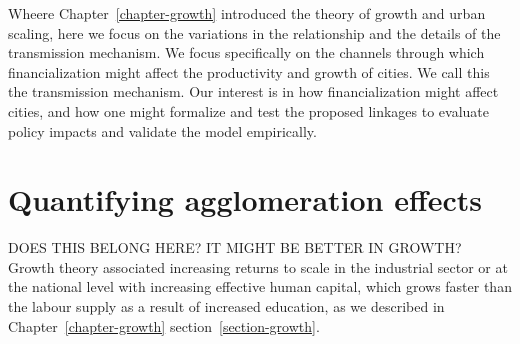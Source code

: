 Wheere Chapter~\ref{chapter-growth} introduced the theory of growth and urban scaling, here we focus on the variations in the relationship and the details of the transmission mechanism. We focus specifically on the channels through which financialization might affect the productivity and growth of cities. We call this the \gls{transmission mechanism}.
Our interest is in how financialization might affect cities, and how one might formalize and test the proposed linkages to evaluate policy impacts and validate the model empirically.








\section{Quantifying agglomeration effects}
DOES THIS BELONG HERE? IT MIGHT BE BETTER IN GROWTH?
Growth theory associated increasing returns to scale in the industrial sector or at the national level with increasing effective human capital, which grows faster than the labour supply as a result of increased education, as we described in Chapter~\ref{chapter-growth} section~\ref{section-growth}. %
 

